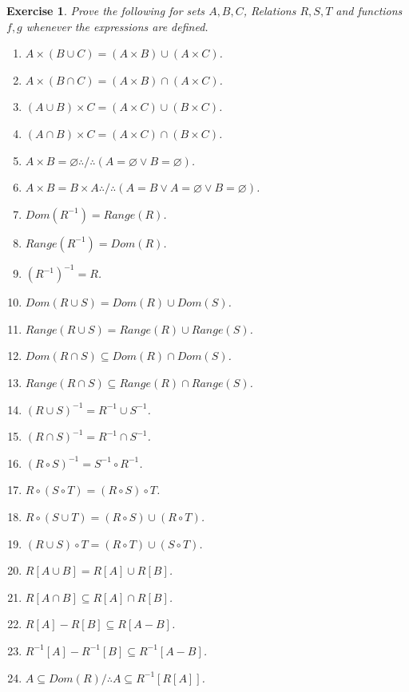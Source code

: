 \documentclass[10pt,a4paper]{book}
\newtheorem{exercise}{Exercise}[section]
\begin{document}
\begin{exercise}
    \textbf{} Prove the following for sets $A,B,C$, Relations $R,S,T$ and functions $f,g$ whenever the expressions are defined.

    \begin{enumerate}
        \item $A\times(B\cup C)=(A\times B)\cup(A\times C)$.
        \item $A\times(B\cap C)=(A\times B)\cap(A\times C)$.
        \item $(A\cup B)\times C=(A\times C)\cup(B\times C)$.
        \item $(A\cap B)\times C=(A\times C)\cap(B\times C)$.
        \item $A\times B=\varnothing \therefore / \therefore (A=\varnothing \lor B=\varnothing)$.
        \item $A\times B=B\times A \therefore / \therefore (A=B \lor A=\varnothing \lor B=\varnothing)$.
        \item $Dom(R^{-1})=Range(R)$.
        \item $Range(R^{-1})=Dom(R)$.
        \item $(R^{-1})^{-1}=R$.
        \item $Dom(R\cup S)=Dom(R)\cup Dom(S)$.
        \item $Range(R\cup S)=Range(R)\cup Range(S)$.
        \item $Dom(R\cap S)\subseteq Dom(R)\cap Dom(S)$.
        \item $Range(R\cap S)\subseteq Range(R)\cap Range(S)$.
        \item $(R\cup S)^{-1}=R^{-1}\cup S^{-1}$.
        \item $(R\cap S)^{-1}=R^{-1}\cap S^{-1}$.
        \item $(R\circ S)^{-1}=S^{-1}\circ R^{-1}$.
        \item $R\circ(S\circ T)=(R\circ S)\circ T$.
        \item $R\circ(S\cup T)=(R\circ S)\cup(R\circ T)$.
        \item $(R\cup S)\circ T=(R\circ T)\cup(S\circ T)$.
        \item $R[A\cup B]=R[A]\cup R[B]$.
        \item $R[A\cap B]\subseteq R[A]\cap R[B]$.
        \item $R[A]-R[B]\subseteq R[A-B]$.
        \item $R^{-1}[A]-R^{-1}[B]
                  \subseteq R^{-1}[A-B]$.
        \item $ A \subseteq Dom(R) / \therefore A \subseteq  R^{-1}[R[A]]$.

\end{enumerate}
\end{exercise}
\end{document}
